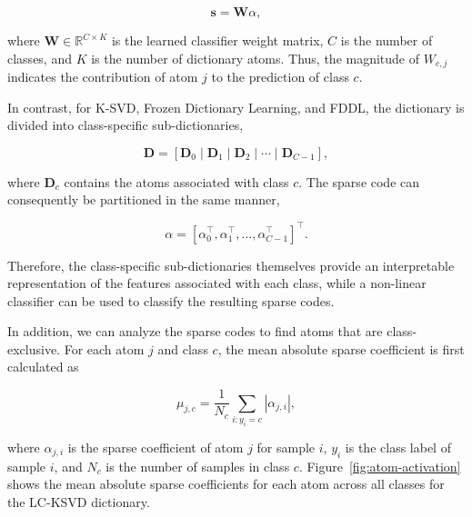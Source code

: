 \begin{equation}[Linear Classifier Class Scores]
\mathbf{s} = \mathbf{W}\alpha,
\end{equation}

\noindent where $\mathbf{W} \in \mathbb{R}^{C \times K}$ is the learned classifier weight matrix, $C$ is the number of classes,
and $K$ is the number of dictionary atoms. Thus, the magnitude of $W_{c,j}$ indicates the contribution of atom $j$ to the
prediction of class $c$.

In contrast, for K-SVD, Frozen Dictionary Learning, and FDDL, the dictionary is divided into class-specific sub-dictionaries,

\begin{equation}[Class-Specific Sub-Dictionaries]
\label{eq:class-specific-sub-dictionaries}
\mathbf{D}
=
\left[
\mathbf{D}_{0}\mid
\mathbf{D}_{1}\mid
\mathbf{D}_{2}\mid
\cdots\mid
\mathbf{D}_{C-1}
\right],
\end{equation}

\noindent where $\mathbf{D}_{c}$ contains the atoms associated with class $c$.
The sparse code can consequently be partitioned in the same manner,

\begin{equation}[Partitioned Sparse Code]
\label{eq:partitioned-sparse-code}
\alpha
=
\left[
\alpha_{0}^{\top},
\alpha_{1}^{\top},
\ldots,
\alpha_{C-1}^{\top}
\right]^{\top}.
\end{equation}

Therefore, the class-specific sub-dictionaries themselves provide an interpretable representation of the features associated
with each class, while a non-linear classifier can be used to classify the resulting sparse codes.

In addition, we can analyze the sparse codes to find atoms that are class-exclusive. For each atom $j$ and class $c$,
the mean absolute sparse coefficient is first calculated as

\begin{equation}[Mean Absolute Sparse Coefficient]
\mu_{j,c}
=
\frac{1}{N_c}
\sum_{i:y_i=c}
\left|\alpha_{j,i}\right|,
\end{equation}

\noindent where $\alpha_{j,i}$ is the sparse coefficient of atom $j$ for sample $i$, $y_i$ is the class label of sample $i$,
and $N_c$ is the number of samples in class $c$. Figure~\ref{fig:atom-activation} shows the mean absolute sparse coefficients
for each atom across all classes for the LC-KSVD dictionary.

